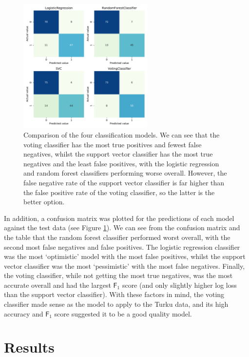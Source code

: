 \documentclass{article}
\begin{document}
    \begin{figure}[t]
        \centering
        \includegraphics[width=0.6\textwidth]{model_comparison.pdf}
        \caption{\label{fig:ModelComparison}Comparison of the four classification models. 
        We can see that the voting classifier has the most true positives and fewest false negatives, whilst the support vector classifier has the most true negatives and the least false positives, with the logistic regression and random forest classifiers performing worse overall. 
        However, the false negative rate of the support vector classifier is far higher than the false positive rate of the voting classifier, so the latter is the better option.}
    \end{figure}

    In addition, a confusion matrix was plotted for the predictions of each model against the test data (see Figure \ref{fig:ModelComparison}).
    We can see from the confusion matrix and the table that the random forest classifier performed worst overall, with the second most false negatives and false positives. 
    The logistic regression classifier was the most `optimistic' model with the most false positives, whilst the support vector classifier was the most `pessimistic' with the most false negatives.
    Finally, the voting classifier, while not getting the most true negatives, was the most accurate overall and had the largest $\mathsf{F}_1$ score (and only slightly higher log loss than the support vector classifier).
    With these factors in mind, the voting classifier made sense as the model to apply to the Turku data, and its high accuracy and $\mathsf{F}_1$ score suggested it to be a good quality model.


    \section{Results}
\end{document}

